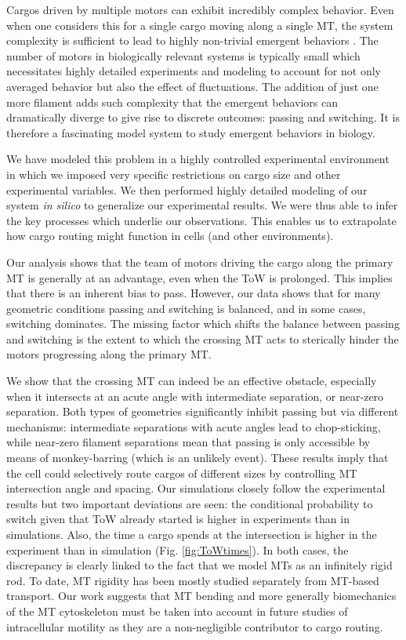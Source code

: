 Cargos driven by multiple motors can exhibit incredibly complex behavior. Even when one considers this for a single cargo moving along a single MT, the system complexity is sufficient to lead to highly non-trivial emergent behaviors \cite{Kunwar2008,Jamison2010}. The number of motors in biologically relevant systems is typically small which necessitates highly detailed experiments and modeling to account for not only averaged behavior but also the effect of fluctuations. The addition of just one more filament adds such complexity that the emergent behaviors can dramatically diverge to give rise to discrete outcomes: passing and switching. It is therefore a fascinating model system to study emergent behaviors in biology.

We have modeled this problem in a highly controlled experimental environment in which we imposed very specific restrictions on cargo size and other experimental variables. We then performed highly detailed modeling of our system \textit{in silico} to generalize our experimental results. We were thus able to infer the key processes which underlie our observations. This enables us to extrapolate how cargo routing might function in cells (and other environments).

Our analysis shows that the team of motors driving the cargo along the primary MT is generally at an advantage, even when the ToW is prolonged. This implies that there is an inherent bias to pass. However, our data shows that for many geometric conditions passing and switching is balanced, and in some cases, switching dominates. The missing factor which shifts the balance between passing and switching is the extent to which the crossing MT acts to sterically hinder the motors progressing along the primary MT.

We show that the crossing MT can indeed be an effective obstacle, especially when it intersects at an acute angle with intermediate separation, or near-zero separation. Both types of geometries significantly inhibit passing but via different mechanisms: intermediate separations with acute angles lead to chop-sticking, while near-zero filament separations mean that passing is only accessible by means of monkey-barring (which is an unlikely event). These results imply that the cell could selectively route cargos of different sizes by controlling MT intersection angle and spacing.
Our simulations closely follow the experimental results but two important deviations are seen: the conditional probability to switch given that ToW already started is higher in experiments than in simulations. Also, the time a cargo spends at the intersection is higher in the experiment than in simulation (Fig. \ref{fig:ToWtimes}). In both cases, the discrepancy is clearly linked to the fact that we model MTs as an infinitely rigid rod. To date, MT rigidity has been mostly studied separately from MT-based transport. Our work suggests that MT bending and more generally biomechanics of the MT cytoskeleton must be taken into account in future studies of intracellular motility as they are a non-negligible contributor to cargo routing.
                      
